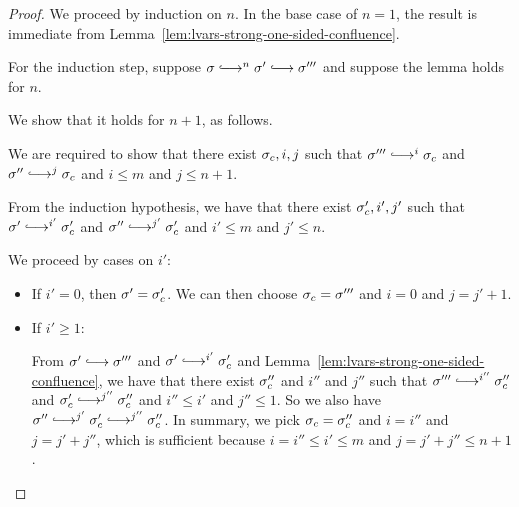 \begin{proof}

  We proceed by induction on $n$.  In the base case of $n = 1$, the
  result is immediate from
  Lemma~\ref{lem:lvars-strong-one-sided-confluence}.

  For the induction step, suppose $\conf \parstepsto^n \conf'
  \parstepsto \conf'''$ and suppose the lemma holds for $n$.

  We show that it holds for $n + 1$, as follows.

  We are required to show that there exist $\sigma_c, i, j$ such that
  $\conf''' \parstepsto^i \conf_c$ and $\conf'' \parstepsto^j \conf_c$
  and $i \leq m$ and $j \leq n + 1$.

  From the induction hypothesis, we have that there exist $\sigma'_c,
  i', j'$ such that $\conf' \parstepsto^{i'} \conf'_c$ and $\conf''
  \parstepsto^{j'} \conf'_c$ and $i' \leq m$ and $j' \leq n$.

  We proceed by cases on $i'$:
  \begin{itemize}

  \item If $i' = 0$, then $\sigma' = \sigma_c'$.  We can then choose
    $\sigma_c = \sigma'''$ and $i = 0$ and $j = j' + 1$.

  \item If $i' \geq 1$:

    From $\conf' \parstepsto \conf'''$ and $\conf' \parstepsto^{i'}
    \conf_c'$ and Lemma~\ref{lem:lvars-strong-one-sided-confluence},
    we have that there exist $\sigma_c''$ and $i''$ and $j''$ such that
    $\conf''' \parstepsto^{i''} \conf_c''$ and $\conf_c'
    \parstepsto^{j''} \conf_c''$ and $i'' \leq i'$ and $j'' \leq 1$.
    So we also have $\conf'' \parstepsto^{j'} \conf_c'
    \parstepsto^{j''} \conf_c''$.  In summary, we pick $\sigma_c =
    \sigma_c''$ and $i = i''$ and $j = j' + j''$, which is sufficient
    because $i = i'' \leq i' \leq m$ and $j = j' + j'' \leq n + 1$.
  \end{itemize}

\end{proof}

